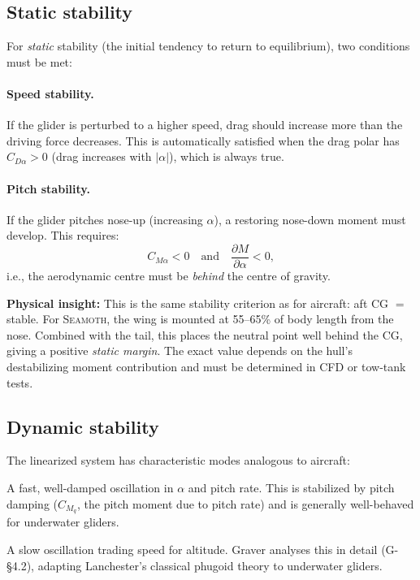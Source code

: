 \documentclass[11pt,a4paper]{article}
\newcommand{\seamoth}{\textsc{Seamoth}}
\newcommand{\insight}[1]{\par\smallskip\noindent\colorbox{green!8}{\parbox{\dimexpr\linewidth-2\fboxsep}{%
  \small\textbf{Physical insight:} #1}}\smallskip}
\begin{document}
\subsection{Static stability}

For \emph{static} stability (the initial tendency to return to equilibrium),
two conditions must be met:

\paragraph{Speed stability.}
If the glider is perturbed to a higher speed, drag should increase more than the
driving force decreases.  This is automatically satisfied when the drag polar has
$C_{D\alpha}>0$ (drag increases with $|\alpha|$), which is always true.

\paragraph{Pitch stability.}
If the glider pitches nose-up (increasing $\alpha$), a restoring nose-down moment
must develop.  This requires:
\begin{equation}
  C_{M\alpha} < 0
  \quad\text{and}\quad
  \frac{\partial M}{\partial\alpha} < 0,
  \label{eq:pitchstab}
\end{equation}
i.e., the aerodynamic centre must be \emph{behind} the centre of gravity.

\insight{This is the same stability criterion as for aircraft: aft CG $=$ stable.
For \seamoth{}, the wing is mounted at 55--65\% of body length from the nose.
Combined with the tail, this places the neutral point well behind the CG, giving
a positive \emph{static margin}.  The exact value depends on the hull's
destabilizing moment contribution and must be determined in CFD or tow-tank tests.}

\subsection{Dynamic stability}

The linearized system has characteristic modes analogous to aircraft:

\begin{description}[nosep]
  \item[Short period mode:] A fast, well-damped oscillation in $\alpha$ and pitch rate.
    This is stabilized by pitch damping ($C_{M_q}$, the pitch moment due to pitch rate)
    and is generally well-behaved for underwater gliders.
  \item[Phugoid mode:] A slow oscillation trading speed for altitude.  Graver analyses
    this in detail (G-\S4.2), adapting Lanchester's classical phugoid theory to underwater
    gliders.
\end{description}
\end{document}
